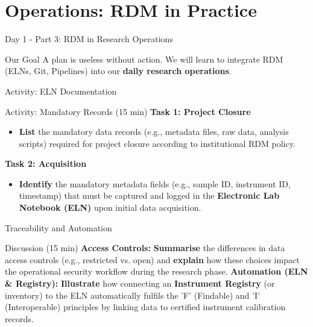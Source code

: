 \documentclass{integrity} %
\begin{document}
\section{Operations: RDM in Practice}

\begin{frame}{Day 1 - Part 3: RDM in Research Operations}
    \begin{block}{Our Goal}
        A plan is useless without action. We will learn to integrate RDM (ELNs, Git, Pipelines) into our \textbf{daily research operations}.
    \end{block}
\end{frame}

\begin{frame}{Activity: ELN Documentation}
    \begin{block}{Activity: Mandatory Records (15 min)}
        \textbf{Task 1: Project Closure}
        \begin{itemize}
            \item \textbf{List} the mandatory data records (e.g., metadata files, raw data, analysis scripts) required for project closure according to institutional RDM policy.
        \end{itemize}
        \pause
        \textbf{Task 2: Acquisition}
        \begin{itemize}
            \item \textbf{Identify} the mandatory metadata fields (e.g., sample ID, instrument ID, timestamp) that must be captured and logged in the \textbf{Electronic Lab Notebook (ELN)} upon initial data acquisition.
        \end{itemize}
    \end{block}
\end{frame}

\begin{frame}{Traceability and Automation}
    \begin{block}{Discussion (15 min)}
        \textbf{Access Controls:} \textbf{Summarise} the differences in data access controls (e.g., restricted vs. open) and \textbf{explain} how these choices impact the operational security workflow during the research phase.
        \pause
        \textbf{Automation (ELN \& Registry):} \textbf{Illustrate} how connecting an \textbf{Instrument Registry} (or inventory) to the ELN automatically fulfils the 'F' (Findable) and 'I' (Interoperable) principles by linking data to certified instrument calibration records.
    \end{block}
\end{frame}
\end{document}

